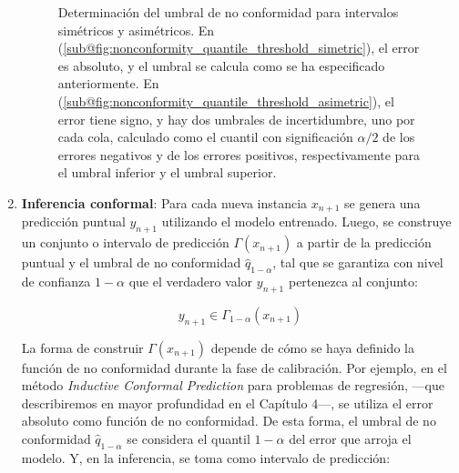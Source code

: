 \begin{enumerate}
\begin{figure}[h]
        \caption[
            Determinación del umbral de no conformidad para intervalos simétricos y asimétricos.
        ]{
            Determinación del umbral de no conformidad para intervalos simétricos y asimétricos. 
            En (\ref{sub@fig:nonconformity_quantile_threshold_simetric}), el error es absoluto, y el umbral
            se calcula como se ha especificado anteriormente. 
            En (\ref{sub@fig:nonconformity_quantile_threshold_asimetric}), el error tiene signo, y hay dos
            umbrales de incertidumbre, uno por cada cola, calculado como el cuantil con significación
            $\alpha/2$ de los errores negativos y de los errores positivos, respectivamente para el umbral
            inferior y el umbral superior. 
        }
        \label{fig:nonconformity_quantile_comparison}
    \end{figure}


    \item \textbf{Inferencia conformal}: Para cada nueva instancia $x_{n+1}$ se genera una predicción puntual
    $y_{n+1}$ utilizando el modelo entrenado. Luego, se construye un conjunto o intervalo de predicción
    $\Gamma(x_{n+1})$ a partir de la predicción puntual y el umbral de no conformidad $\hat{q}_{1-\alpha}$, 
    tal que se garantiza con nivel de confianza $1-\alpha$ que el verdadero valor $y_{n+1}$ pertenezca al
    conjunto:
    
    $$
    y_{n+1} \in \Gamma_{1-\alpha}(x_{n+1})
    $$

    La forma de construir $\Gamma(x_{n+1})$ depende de cómo se haya definido la función de no conformidad 
    durante la fase de calibración.
    Por ejemplo, en el método \textit{Inductive Conformal Prediction} \cite{papadopoulos2002} para problemas 
    de regresión, ---que describiremos en mayor profundidad en el Capítulo 4---, se utiliza el error absoluto 
    como función de no conformidad. De esta forma, el umbral de no conformidad $\hat{q}_{1-\alpha}$ se 
    considera el quantil $1-\alpha$ del error que arroja el modelo. Y, en la inferencia, se toma como 
    intervalo de predicción:



\end{enumerate}
